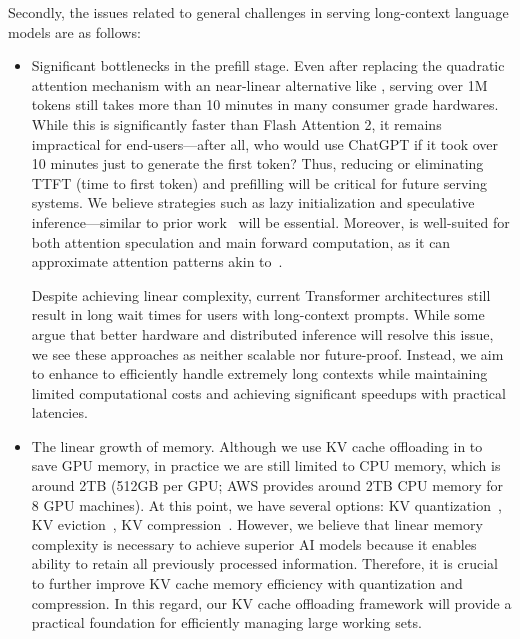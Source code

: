Secondly, the issues related to general challenges in serving long-context language models are as follows:
\begin{itemize}

\item Significant bottlenecks in the prefill stage. Even after replacing the quadratic attention mechanism with an near-linear alternative like \ours, serving over 1M tokens still takes more than 10 minutes in many consumer grade hardwares. While this is significantly faster than Flash Attention 2, it remains impractical for end-users—after all, who would use ChatGPT if it took over 10 minutes just to generate the first token?
Thus, reducing or eliminating TTFT (time to first token) and prefilling will be critical for future serving systems.
We believe strategies such as lazy initialization and speculative inference—similar to prior work~\citep{fu2024lazyllmdynamictokenpruning, lee2023sttabt} will be essential. 
Moreover, \ours is well-suited for both attention speculation and main forward computation, as it can approximate attention patterns akin to~\citet{lee2024sea}.

Despite achieving linear complexity, current Transformer architectures still result in long wait times for users with long-context prompts. While some argue that better hardware and distributed inference will resolve this issue, we see these approaches as neither scalable nor future-proof. Instead, we aim to enhance \ours to efficiently handle extremely long contexts while maintaining limited computational costs and achieving significant speedups with practical latencies.

\item The linear growth of memory. Although we use KV cache offloading in \ours to save GPU memory, in practice we are still limited to CPU memory, which is around 2TB (512GB per GPU; AWS provides around 2TB CPU memory for 8 GPU machines). At this point, we have several options: KV quantization~\citep{hooper2024kvquant10millioncontext}, KV eviction~\citep{li2024snapkv, willette2024cascade}, KV compression~\citep{deepseekv2mla}. However, we believe that linear memory complexity is necessary to achieve superior AI models because it enables ability to retain all previously processed information. Therefore, it is crucial to further improve KV cache memory efficiency with quantization and compression. In this regard, our KV cache offloading framework will provide a practical foundation for efficiently managing large working sets.

\end{itemize}
